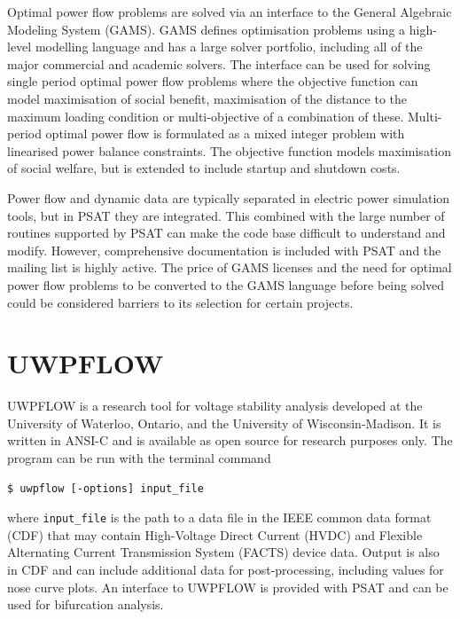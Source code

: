 Optimal power flow problems are solved via an interface to the General
Algebraic Modeling System (GAMS).  GAMS defines optimisation
problems using a high-level modelling language and has a large solver portfolio, including all
of the major commercial and academic solvers.  The interface can be used for
solving single period optimal power flow problems where the objective function
can model maximisation of social benefit, maximisation of the distance to
the maximum loading condition or multi-objective of a combination of these.
Multi-period optimal power flow is formulated as a mixed integer problem with
linearised power balance constraints.  The objective function models
maximisation of social welfare, but is extended to include startup and
shutdown costs.

Power flow and dynamic data are typically separated in electric power
simulation tools, but in PSAT they are integrated.  This combined with the
large number of routines supported by PSAT can make the code base difficult to
understand and modify.  However, comprehensive documentation is included with
PSAT and the mailing list is highly active.
The price of GAMS
licenses and the need for optimal power flow problems to be converted to the
GAMS language before being solved could be considered barriers to its
selection for certain projects.

\section{UWPFLOW}
UWPFLOW is a research tool for voltage stability analysis developed at the
University of Waterloo, Ontario, and the University of Wisconsin-Madison.  It
is written in ANSI-C and is available as open source for research purposes
only. The program can be run with the terminal command
\begin{center}
\begin{verbatim}
$ uwpflow [-options] input_file
\end{verbatim}
\end{center}
where \texttt{input\_file} is the path to a data file in the IEEE common data
format (CDF) \cite{cdf:73} that may contain High-Voltage Direct Current (HVDC)
and Flexible Alternating Current Transmission System (FACTS) device data.
Output is also in CDF and can include additional data for post-processing,
including values for nose curve plots.  An interface to UWPFLOW is provided
with PSAT and can be used for bifurcation analysis.


